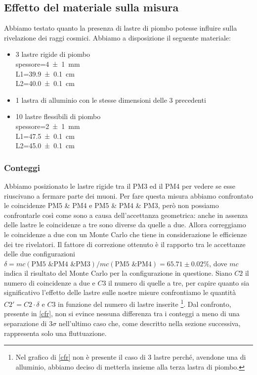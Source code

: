 
\subsection{Effetto del materiale sulla misura}

Abbiamo testato quanto la presenza di lastre di piombo potesse influire sulla rivelazione dei raggi cosmici. Abbiamo a disposizione il seguente materiale:
\begin{itemize}

\item 3 lastre rigide di piombo\\
spessore=\SI{4\pm1}{mm}\\
L1=\SI{39.9\pm0.1}{ cm}\\
L2=\SI{40.0\pm0.1}{cm}

\item 1 lastra di alluminio con le stesse dimensioni delle 3 precedenti

\item 10 lastre flessibili di piombo\\
spessore=\SI{2\pm1}{ mm}\\
L1=\SI{47.5\pm0.1}{ cm}\\
L2=\SI{45.0\pm0.1}{ cm}

\end{itemize}

\subsubsection{Conteggi}

Abbiamo posizionato le lastre rigide tra il PM3 ed il PM4 per vedere se esse riuscivano a fermare parte dei muoni. Per fare questa misura abbiamo confrontato le coincidenze  PM5 \& PM4 e PM5 \& PM4 \& PM3, però non possiamo confrontarle così come sono a causa dell'accettanza geometrica: anche in assenza delle lastre le coincidenze a tre sono diverse da quelle a due. Allora correggiamo le coincidenze a due con un Monte Carlo che tiene in considerazione le efficienze dei tre rivelatori. Il fattore di correzione ottenuto è il rapporto tra le accettanze delle due configurazioni  $\delta=mc(\text{PM5 \& PM4 \&PM3})/mc(\text{PM5 \& PM4})=65.71\pm0.02\%$, dove $mc$ indica il risultato del Monte Carlo per la configurazione in questione. Siano $C2$ il numero di coincidenze a due e $C3$ il numero di quelle a tre, per capire quanto sia significativo l'effetto delle lastre sulle nostre misure confrontiamo le quantità $C2'=C2 \cdot \delta$ e $C3$ in funzione del numero di lastre inserite%
\footnote{Nel grafico di \autoref{cfr} non è presente il caso di 3 lastre perché, avendone una di alluminio, abbiamo deciso di metterla insieme alla terza lastra di piombo.}. %
Dal confronto, presente in \autoref{cfr}, non si evince nessuna differenza tra i conteggi a meno di una separazione di $3\sigma$ nell'ultimo caso che, come descritto nella sezione successiva, rappresenta solo una fluttuazione.

